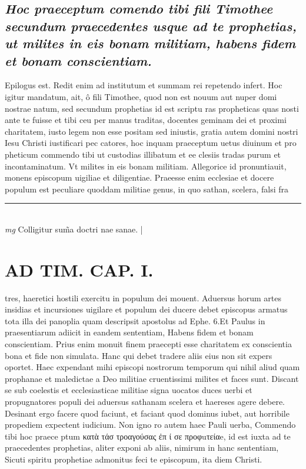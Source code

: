 \documentclass{article}
\begin{document}
\begin{pages}
\subsection*{\textit{Hoc praeceptum comendo tibi fili Timothee secundum praecedentes usque ad te prophetias, ut milites in eis bonam militiam, habens fidem et bonam conscientiam. }}\pstart Epilogus est. Redit enim ad institutum et summam rei repetendo infert. Hoc igitur mandatum, ait, ô fili Timothee, quod non est nouum aut nuper domi nostrae natum, sed secundum prophetias id est scriptu ras propheticas quas nosti ante te fuisse et tibi ceu per manus traditas, docentes geminam dei et proximi charitatem, iusto legem non esse positam sed iniustis, gratia autem domini nostri Iesu Christi iustificari pec catores, hoc inquam praeceptum uetus diuinum et pro pheticum commendo tibi ut custodias illibatum et ee clesiis tradas purum et incontaminatum. Vt milites in eis bonam militiam. Allegorice id pronuntiauit, monens episcopum uigiliae et diligentiae. Praeesse enim ecclesiae et docere populum est peculiare quoddam militiae genus, in quo sathan, scelera, falsi fra\pend
\vspace{0.5cm}\noindent
\vspace{0.2cm}\rule{1cm}{0.2pt}\\ 
\hspace{0.2cm}\textit{mg}
\footnotesize Colligitur sum̃a doctri nae sanae. 
\normalsize| 
\section*{AD TIM. CAP. I. }
\marginpar{[ p.107 ]}\pstart tres, haeretici hostili exercitu in populum dei mouent. Aduersus horum artes insidias et incursiones uigilare et populum dei ducere debet episcopus armatus tota illa dei panoplia quam descripsit apostolus ad Ephe. 6.Et Paulus in praesentiarum adiicit in eandem sententiam, Habens fidem et bonam conscientiam. Prius enim monuit finem praecepti esse charitatem ex conscientia bona et fide non simulata. Hanc qui debet tradere aliis eius non sit expers oportet. Haec expendant mihi episcopi nostrorum temporum qui nihil aliud quam prophanae et maledictae a Deo militiae cruentissimi milites et faces sunt. Discant se sub coelestis et ecclesiasticae militiae signa uocatos duces uerbi et propugnatores populi dei aduersus sathanam scelera et haereses agere debere. Desinant ergo facere quod faciunt, et faciant quod dominus iubet, aut horribile propediem expectent iudicium. Non igno ro autem haec Pauli uerba, Commendo tibi hoc praece ptum κατὰ τάσ τροαγούσας ἐπ ί σε προφuτείαe, id est iuxta ad te praecedentes prophetias, aliter exponi ab aliis, nimirum in hanc sententiam, Sicuti spiritu prophetiae admonitus feci te episcopum, ita diem Christi.  \pend

\end{pages}
\end{document}
